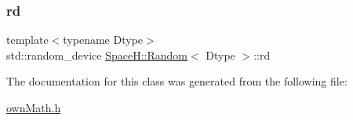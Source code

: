 \mbox{\label{class_space_h_1_1_random_a2d705e3238648654f3e675ad77c00943}} 
\subsubsection{\texorpdfstring{rd}{rd}}
{\footnotesize\ttfamily template$<$typename Dtype$>$ \\
std\+::random\+\_\+device \mbox{\hyperlink{class_space_h_1_1_random}{Space\+H\+::\+Random}}$<$ Dtype $>$\+::rd}



The documentation for this class was generated from the following file\+:\begin{DoxyCompactItemize}
\item 
\mbox{\hyperlink{own_math_8h}{own\+Math.\+h}}\end{DoxyCompactItemize}
